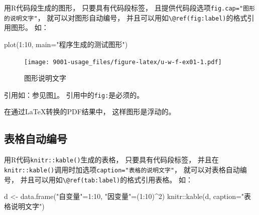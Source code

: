 \documentclass[
]{book}
\newenvironment{Shaded}{\begin{snugshade}}{\end{snugshade}}
\newcommand{\AttributeTok}[1]{\textcolor[rgb]{0.77,0.63,0.00}{#1}}
\newcommand{\DecValTok}[1]{\textcolor[rgb]{0.00,0.00,0.81}{#1}}
\newcommand{\FunctionTok}[1]{\textcolor[rgb]{0.00,0.00,0.00}{#1}}
\newcommand{\NormalTok}[1]{#1}
\newcommand{\OtherTok}[1]{\textcolor[rgb]{0.56,0.35,0.01}{#1}}
\newcommand{\SpecialCharTok}[1]{\textcolor[rgb]{0.00,0.00,0.00}{#1}}
\newcommand{\StringTok}[1]{\textcolor[rgb]{0.31,0.60,0.02}{#1}}
\begin{document}
用R代码段生成的图形，
只要具有代码段标签，
且提供代码段选项\texttt{fig.cap="图形的说明文字"}，
就可以对图形自动编号，
并且可以用如\texttt{\textbackslash{}@ref(fig:label)}的格式引用图形。
如：

\begin{Shaded}
\begin{Highlighting}[]
\FunctionTok{plot}\NormalTok{(}\DecValTok{1}\SpecialCharTok{:}\DecValTok{10}\NormalTok{, }\AttributeTok{main=}\StringTok{"程序生成的测试图形"}\NormalTok{)}
\end{Highlighting}
\end{Shaded}

\begin{figure}
\centering
\texttt{[image: 9001-usage\_files/figure-latex/u-w-f-ex01-1.pdf]}
\caption{\label{fig:u-w-f-ex01}图形说明文字}
\end{figure}

引用如：参见图\ref{fig:u-w-f-ex01}。
引用中的\texttt{fig:}是必须的。

在通过LaTeX转换的PDF结果中，
这样图形是浮动的。

\hypertarget{usage-writing-tab}{%
\subsection{表格自动编号}\label{usage-writing-tab}}

用R代码\texttt{knitr::kable()}生成的表格，
只要具有代码段标签，
并且在\texttt{knitr::kable()}调用时加选项\texttt{caption="表格的说明文字"}，
就可以对表格自动编号，
并且可以用如\texttt{\textbackslash{}@ref(tab:label)}的格式引用表格。
如：

\begin{Shaded}
\begin{Highlighting}[]
\NormalTok{d }\OtherTok{\textless{}{-}} \FunctionTok{data.frame}\NormalTok{(}\StringTok{"自变量"}\OtherTok{=}\DecValTok{1}\SpecialCharTok{:}\DecValTok{10}\NormalTok{, }\StringTok{"因变量"}\OtherTok{=}\NormalTok{(}\DecValTok{1}\SpecialCharTok{:}\DecValTok{10}\NormalTok{)}\SpecialCharTok{\^{}}\DecValTok{2}\NormalTok{)}
\NormalTok{knitr}\SpecialCharTok{::}\FunctionTok{kable}\NormalTok{(d, }\AttributeTok{caption=}\StringTok{"表格说明文字"}\NormalTok{)}
\end{Highlighting}
\end{Shaded}
\end{document}
